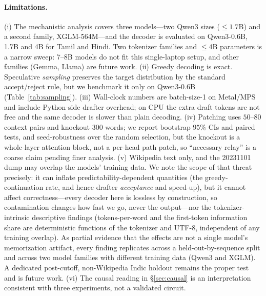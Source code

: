 \paragraph{Limitations.} (i) The mechanistic analysis covers three models---two
Qwen3 sizes ($\le 1.7$B) and a second family, XGLM-564M---and the decoder is
evaluated on Qwen3-0.6B, 1.7B and 4B for Tamil and Hindi. Two tokenizer families
and $\le 4$B parameters is a narrow sweep: 7--8B models do not fit this
single-laptop setup, and other families (Gemma, Llama) are future work.
(ii) Greedy decoding is exact. Speculative \emph{sampling} preserves the target
distribution by the standard accept/reject rule, but we benchmark it only on
Qwen3-0.6B (Table~\ref{tab:sampling}). (iii) Wall-clock numbers are batch-size-1 on Metal/MPS and
include Python-side drafter overhead; on CPU the extra draft tokens are not free
and the same decoder is slower than plain decoding. (iv) Patching uses
$50$--$80$ context pairs and knockout $300$ words; we report bootstrap $95\%$
CIs and paired tests, and seed-robustness over the random selection, but the
knockout is a whole-layer attention block, not a per-head path patch, so
``necessary relay'' is a coarse claim pending finer analysis. (v) Wikipedia text
only, and the 20231101 dump may overlap the models' training data. We note the
scope of that threat precisely: it can inflate predictability-dependent
quantities (the greedy-continuation rate, and hence drafter \emph{acceptance}
and speed-up), but it cannot affect correctness---every decoder here is lossless
by construction, so contamination changes how fast we go, never the output---nor
the tokenizer-intrinsic descriptive findings (tokens-per-word and the
first-token information share are deterministic functions of the tokenizer and
UTF-8, independent of any training overlap). As partial evidence that the
effects are not a single model's memorization artifact, every finding replicates
across a held-out-by-sequence split and across two model families with different
training data (Qwen3 and XGLM). A dedicated post-cutoff, non-Wikipedia Indic
holdout remains the proper test and is future work. (vi) The causal reading in
\S\ref{sec:causal} is an interpretation consistent with three experiments, not
a validated circuit.

